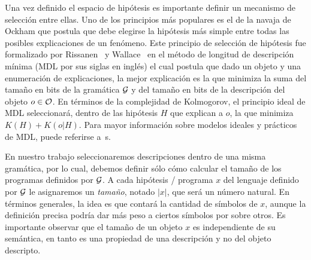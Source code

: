 Una vez definido el espacio de hipótesis es importante definir un mecanismo de selección entre ellas. Uno de los principios más populares es el de la navaja de Ockham que postula que debe elegirse la hipótesis más simple entre todas las posibles explicaciones de un fenómeno. Este principio de selección de hipótesis fue formalizado por Rissanen~\cite{rissanen1978modeling} y Wallace~\cite{wallace1968information} en el método de longitud de descripción mínima (MDL por sus siglas en inglés) el cual postula que dado un objeto y una enumeración de explicaciones, la mejor explicación es la que minimiza la suma del tamaño en bits de la gramática $\gram$ y del tamaño en bits de la descripción del objeto $o \in \+O$. En términos de la complejidad de Kolmogorov, el principio ideal de MDL seleccionará, dentro de las hipótesis $H$ que explican a $o$, la que minimiza $K(H) + K(o|H)$. Para mayor información sobre modelos ideales y prácticos de MDL, puede referirse a~s\cite{grunwald2007minimum,li2013introduction}.

En nuestro trabajo seleccionaremos descripciones dentro de una misma gramática, por lo cual, debemos definir sólo cómo calcular el tamaño de los programas definidos por $\gram$. A cada hipótesis / programa $x$ del lenguaje definido por $\gram$ le asignaremos un {\em tamaño}, notado $|x|$, que será un número natural. En términos generales, la idea es que contará la cantidad de símbolos de $x$, aunque la definición precisa podría dar más peso a ciertos símbolos por sobre otros. Es importante observar que el tamaño de un objeto $x$ es independiente de su semántica, en tanto es una propiedad de una descripción y no del objeto descripto.

